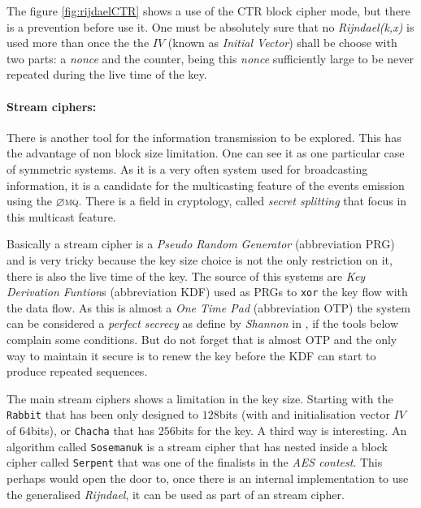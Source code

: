 \documentclass[10pt,a4paper,twoside]{llncs}
\newcommand{\todo}[1]{\texttt{\color{red}TODO:} ``\emph{#1}''}
\newcommand{\zmq}{\textsc{$\varnothing$mq}}
\begin{document}
\begin{figure}[h]
\end{figure}

The figure \ref{fig:rijdaelCTR} shows a use of the CTR block cipher mode, but there is a prevention before use it. One must be absolutely sure that no \emph{Rijndael(k,x)} is used more than once the the $IV$ (known as \emph{Initial Vector}) shall be choose with two parts: a \emph{nonce} and the counter, being this \emph{nonce} sufficiently large to be never repeated during the live time of the key.

\paragraph{Stream ciphers:} There is another tool for the information transmission to be explored. This has the advantage of non block size limitation. One can see it as one particular case of symmetric systems. As it is a very often system used for broadcasting information, it is a candidate for the multicasting feature of the events emission using the \zmq. There is a field in cryptology, called \emph{secret splitting} that focus in this multicast feature.

Basically a stream cipher is a \emph{Pseudo Random Generator} (abbreviation PRG) and is very tricky because the key size choice is not the only restriction on it, there is also the live time of the key. The source of this systems are \emph{Key Derivation Funtion}s (abbreviation KDF) used as PRGs to {\tt xor} the key flow with the data flow. As this is almost a \emph{One Time Pad} (abbreviation OTP) the system can be considered a \emph{perfect secrecy} as define by \emph{Shannon} in \cite{shannon-comTheorySecSys}, if the tools below complain some conditions. But do not forget that is almost OTP and the only way to maintain it secure is to renew the key before the KDF can start to produce repeated sequences.

The main stream ciphers shows a limitation in the key size. Starting with the {\tt Rabbit} \cite{rfc4503} that has been only designed to $128$bits (with and initialisation vector $IV$ of $64$bits), or {\tt Chacha} \cite{bernstein2008chacha} that has $256$bits for the key. A third way is interesting. An algorithm called {\tt Sosemanuk} \cite{berbain2008sosemanuk} is a stream cipher that has nested inside a block cipher called {\tt Serpent} that was one of the finalists in the \emph{AES contest}. This perhaps would open the door to, once there is an internal implementation to use the generalised \emph{Rijndael}, it can be used as part of an stream cipher.
\end{document}
